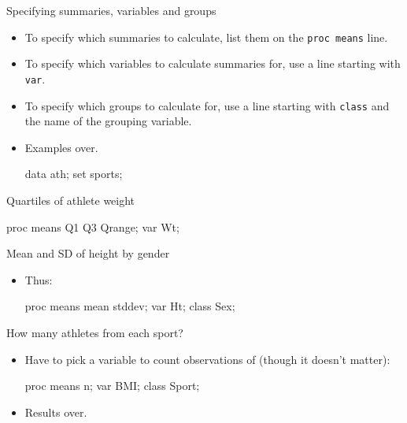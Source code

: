 \documentclass[unknownkeysallowed]{beamer}\usepackage[]{graphicx}\usepackage[]{color}
\begin{document}
\begin{frame}[fragile]{Specifying summaries, variables and groups}
  
  \begin{itemize}
  \item To specify which summaries to calculate, list them on the
    \texttt{proc means} line.
  \item To specify which variables to calculate summaries for, use a
    line starting with \texttt{var}.
  \item To specify which groups to calculate for, use a line starting
    with \texttt{class} and the name of the grouping variable.
  \item Examples over.

    \begin{Datastep}[program]
data ath;
  set sports;
      \end{Datastep}
    
  \end{itemize}
  
\end{frame}

\begin{frame}[fragile]{Quartiles of athlete weight}
  
  \begin{Sascode}[store=sa]
proc means Q1 Q3 Qrange;
  var Wt;
  \end{Sascode}
  
  
\end{frame}

\begin{frame}[fragile]{Mean and SD of height by gender}
  
  \begin{itemize}
  \item Thus:
    
    \begin{Sascode}[store=sb]
proc means mean stddev;
  var Ht;
  class Sex;
    \end{Sascode}
    
  \end{itemize}
  
\end{frame}

\begin{frame}[fragile]{How many athletes from each sport?}
  
  \begin{itemize}
  \item Have to pick a variable to count observations of (though it
    doesn't matter):
    
    \begin{Sascode}[store=sc]
proc means n;
  var BMI;
  class Sport;
    \end{Sascode}
  \item Results over.
    
  \end{itemize}
  
\end{frame}
\end{document}
